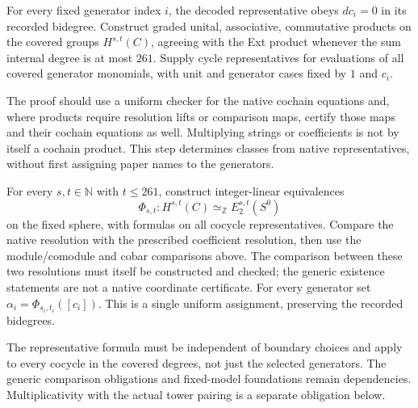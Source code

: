 \begin{proposition}
  \label{prop:lin-native-generator-classes}
  \notready
  For every fixed generator index $i$, the decoded representative obeys
  $dc_i=0$ in its recorded bidegree. Construct graded unital,
  associative, commutative products on the covered groups $H^{s,t}(C)$,
  agreeing with the Ext product whenever the sum internal degree is at
  most $261$. Supply cycle representatives for evaluations of all covered
  generator monomials, with unit and generator cases fixed by $1$ and $c_i$.

  The proof should use a uniform checker for the native cochain equations
  and, where products require resolution lifts or comparison maps,
  certify those maps and their cochain equations as well. Multiplying
  strings or coefficients is not by itself a cochain product. This step
  determines classes from native representatives, without first assigning
  paper names to the generators.
\end{proposition}

\begin{proposition}
  \label{prop:lin-native-actual-comparison}
  \notready
  For every $s,t\in\mathbb N$ with $t\le261$, construct integer-linear
  equivalences
  \[
    \Phi_{s,t}:H^{s,t}(C)\simeq_{\mathbb Z}E_2^{s,t}(S^0)
  \]
  on the fixed sphere, with formulas on all cocycle representatives.
  Compare the native resolution with the prescribed coefficient resolution,
  then use the module/comodule and cobar comparisons above. The comparison
  between these two resolutions must itself be constructed and checked;
  the generic existence statements are not a native coordinate certificate.
  For every generator set $\alpha_i=\Phi_{s_i,t_i}([c_i])$.
  This is a single uniform assignment, preserving the recorded bidegrees.

  The representative formula must be independent of boundary choices and
  apply to every cocycle in the covered degrees, not just the selected
  generators. The generic comparison obligations and fixed-model
  foundations remain dependencies. Multiplicativity with the actual tower
  pairing is a separate obligation below.
\end{proposition}

